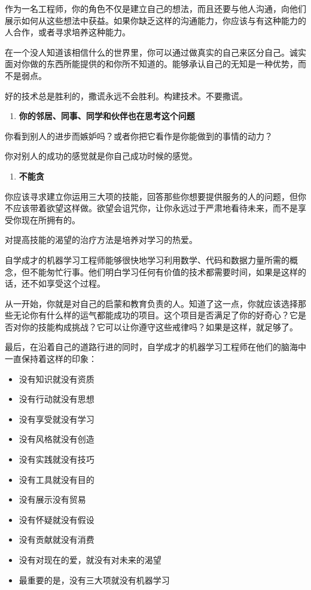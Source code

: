 \documentclass[]{ctexbook}
\providecommand{\tightlist}{%
  \setlength{\itemsep}{0pt}\setlength{\parskip}{0pt}}
\begin{document}
作为一名工程师，你的角色不仅是建立自己的想法，而且还要与他人沟通，向他们展示如何从这些想法中获益。如果你缺乏这样的沟通能力，你应该与有这种能力的人合作，或者寻求培养这种能力。

在一个没人知道该相信什么的世界里，你可以通过做真实的自己来区分自己。诚实面对你做的东西所能提供的和你所不知道的。能够承认自己的无知是一种优势，而不是弱点。

好的技术总是胜利的，撒谎永远不会胜利。构建技术。不要撒谎。

\begin{enumerate}
\def\labelenumi{\arabic{enumi}.}
\setcounter{enumi}{8}
\tightlist
\item
  \textbf{你的邻居、同事、同学和伙伴也在思考这个问题}
\end{enumerate}

你看到别人的进步而嫉妒吗？或者你把它看作是你能做到的事情的动力？

你对别人的成功的感觉就是你自己成功时候的感觉。

\begin{enumerate}
\def\labelenumi{\arabic{enumi}.}
\setcounter{enumi}{9}
\tightlist
\item
  \textbf{不能贪}
\end{enumerate}

你应该寻求建立你运用三大项的技能，回答那些你想要提供服务的人的问题，但你不应该带着欲望这样做。欲望会诅咒你，让你永远过于严肃地看待未来，而不是享受你现在所拥有的。

对提高技能的渴望的治疗方法是培养对学习的热爱。

自学成才的机器学习工程师能够很快地学习利用数学、代码和数据力量所需的概念，但不能匆忙行事。他们明白学习任何有价值的技术都需要时间，如果是这样的话，还不如享受这个过程。

从一开始，你就是对自己的启蒙和教育负责的人。知道了这一点，你就应该选择那些无论你有什么样的运气都能成功的项目。这个项目是否满足了你的好奇心？它是否对你的技能构成挑战？它可以让你遵守这些戒律吗？如果是这样，就足够了。

最后，在沿着自己的道路行进的同时，自学成才的机器学习工程师在他们的脑海中一直保持着这样的印象：

\begin{itemize}
\tightlist
\item
  没有知识就没有资质
\item
  没有行动就没有思想
\item
  没有享受就没有学习
\item
  没有风格就没有创造
\item
  没有实践就没有技巧
\item
  没有工具就没有目的
\item
  没有展示没有贸易
\item
  没有怀疑就没有假设
\item
  没有贡献就没有消费
\item
  没有对现在的爱，就没有对未来的渴望
\item
  最重要的是，没有三大项就没有机器学习
\end{itemize}
\end{document}
